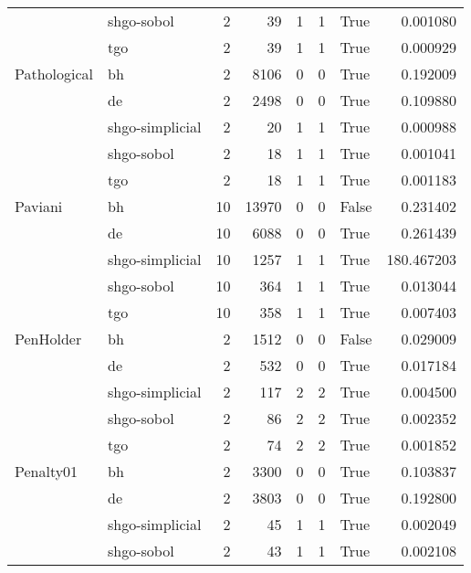 \begin{longtable}{llrrrrlr}
         & shgo-sobol &     2 &       39 &      1 &       1 &    True &    0.001080 \\
         & tgo &     2 &       39 &      1 &       1 &    True &    0.000929 \\
Pathological & bh &     2 &     8106 &      0 &       0 &    True &    0.192009 \\
         & de &     2 &     2498 &      0 &       0 &    True &    0.109880 \\
         & shgo-simplicial &     2 &       20 &      1 &       1 &    True &    0.000988 \\
         & shgo-sobol &     2 &       18 &      1 &       1 &    True &    0.001041 \\
         & tgo &     2 &       18 &      1 &       1 &    True &    0.001183 \\
Paviani & bh &    10 &    13970 &      0 &       0 &   False &    0.231402 \\
         & de &    10 &     6088 &      0 &       0 &    True &    0.261439 \\
         & shgo-simplicial &    10 &     1257 &      1 &       1 &    True &  180.467203 \\
         & shgo-sobol &    10 &      364 &      1 &       1 &    True &    0.013044 \\
         & tgo &    10 &      358 &      1 &       1 &    True &    0.007403 \\
PenHolder & bh &     2 &     1512 &      0 &       0 &   False &    0.029009 \\
         & de &     2 &      532 &      0 &       0 &    True &    0.017184 \\
         & shgo-simplicial &     2 &      117 &      2 &       2 &    True &    0.004500 \\
         & shgo-sobol &     2 &       86 &      2 &       2 &    True &    0.002352 \\
         & tgo &     2 &       74 &      2 &       2 &    True &    0.001852 \\
Penalty01 & bh &     2 &     3300 &      0 &       0 &    True &    0.103837 \\
         & de &     2 &     3803 &      0 &       0 &    True &    0.192800 \\
         & shgo-simplicial &     2 &       45 &      1 &       1 &    True &    0.002049 \\
         & shgo-sobol &     2 &       43 &      1 &       1 &    True &    0.002108 \\

\end{longtable}
